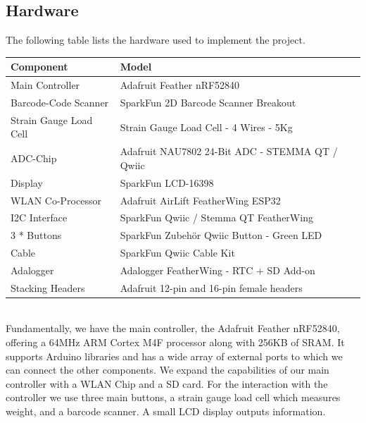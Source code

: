 \documentclass{article}
\begin{document}
\subsection{Hardware}
The following table lists the hardware used to implement the project.
\\[10pt]
\begin{tabular}{l l}
	\hline
	Component              & Model\\
	\hline
	Main Controller        & Adafruit Feather nRF52840\\
	Barcode-Code Scanner   & SparkFun 2D Barcode Scanner Breakout\\
	Strain Gauge Load Cell & Strain Gauge Load Cell - 4 Wires - 5Kg\\
	ADC-Chip               & Adafruit NAU7802 24-Bit ADC - STEMMA QT / Qwiic\\
	Display                & SparkFun LCD-16398\\
	WLAN Co-Processor      & Adafruit AirLift FeatherWing ESP32\\
	I2C Interface          & SparkFun Qwiic / Stemma QT FeatherWing\\
	3 * Buttons            & SparkFun Zubehör Qwiic Button - Green LED\\
	Cable                  & SparkFun Qwiic Cable Kit\\
	Adalogger              & Adalogger FeatherWing - RTC + SD Add-on\\
	Stacking Headers       & Adafruit 12-pin and 16-pin female headers\\
	\hline
\end{tabular} \\[10pt]
Fundamentally, we have the main controller, the Adafruit Feather nRF52840, offering a 64MHz ARM Cortex M4F processor along with 256KB of SRAM.
It supports Arduino libraries and has a wide array of external ports to which we can connect the other components.
We expand the capabilities of our main controller with a WLAN Chip and a SD card.
For the interaction with the controller we use three main buttons, a strain gauge load cell which measures weight, and a barcode scanner.
A small LCD display outputs information. 
\end{document}
